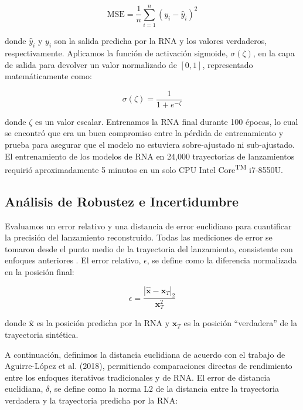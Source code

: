 \documentclass[12pt,a4paper]{article}
\begin{document}
\begin{equation}
\text{MSE} = \frac{1}{n} \sum_{i=1}^{n} (y_i - \hat{y}_i)^2
\end{equation}

donde $\hat{y}_i$ y $y_i$ son la salida predicha por la RNA y los valores verdaderos, respectivamente. Aplicamos la función de activación sigmoide, $\sigma(\zeta)$, en la capa de salida para devolver un valor normalizado de $[0, 1]$, representado matemáticamente como:

\begin{equation}
\sigma(\zeta) = \frac{1}{1 + e^{-\zeta}}
\end{equation}

donde $\zeta$ es un valor escalar. Entrenamos la RNA final durante 100 épocas, lo cual se encontró que era un buen compromiso entre la pérdida de entrenamiento y prueba para asegurar que el modelo no estuviera sobre-ajustado ni sub-ajustado. El entrenamiento de los modelos de RNA en 24,000 trayectorias de lanzamientos requirió aproximadamente 5 minutos en un solo CPU Intel\textsuperscript{\textregistered} Core\textsuperscript{TM} i7-8550U.

\subsection{Análisis de Robustez e Incertidumbre}

Evaluamos un error relativo y una distancia de error euclidiano para cuantificar la precisión del lanzamiento reconstruido. Todas las mediciones de error se tomaron desde el punto medio de la trayectoria del lanzamiento, consistente con enfoques anteriores \citep{aguirre2018}. El error relativo, $\epsilon$, se define como la diferencia normalizada en la posición final:

\begin{equation}
\epsilon = \frac{|\hat{\mathbf{x}} - \mathbf{x}_T|_2}{\mathbf{x}_T^2}
\end{equation}

donde $\hat{\mathbf{x}}$ es la posición predicha por la RNA y $\mathbf{x}_T$ es la posición ``verdadera'' de la trayectoria sintética.

A continuación, definimos la distancia euclidiana de acuerdo con el trabajo de Aguirre-López et al. (2018), permitiendo comparaciones directas de rendimiento entre los enfoques iterativos tradicionales y de RNA. El error de distancia euclidiana, $\delta$, se define como la norma L2 de la distancia entre la trayectoria verdadera y la trayectoria predicha por la RNA:
\end{document}
